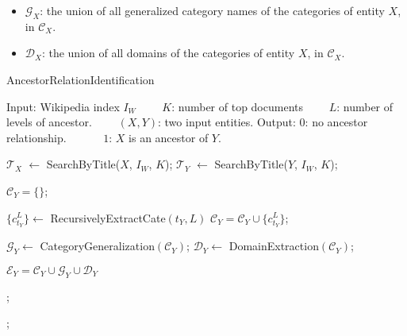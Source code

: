 \begin{itemize}
\item ${\mathcal G}_{X}$: the union of all generalized category names of the categories of entity $X$, in ${\mathcal C}_{X}$.
\item ${\mathcal D}_{X}$: the union of all domains of the categories of entity $X$, in ${\mathcal C}_{X}$.
\end{itemize}

\begin{algorithm} [t]
{\small
\caption{AncestorRelationIdentification}
\label{algAncestorIdentifying} 
\begin{algorithmic}[1]
\STATE Input: Wikipedia index $I_{W	}$ 
\STATE $\qquad$$K$: number of top documents 
\STATE $\qquad$$L$: number of levels of ancestor. 
\STATE $\qquad$$(X, Y)$: two input entities. 
\STATE Output: $0$: no ancestor relationship. 
\STATE $\qquad\quad$$1$: $X$ is an ancestor of $Y$.

\STATE ${\mathcal T_{X}}$ $\leftarrow$ SearchByTitle($X$, $I_{W}$, $K$);
\STATE ${\mathcal T_{Y}}$ $\leftarrow$ SearchByTitle($Y$, $I_{W}$, $K$);

\STATE ${\mathcal C}_{Y} = \{\}$;

\STATE $\{c_{t_{Y}}^{L}\} \leftarrow$ RecursivelyExtractCate$(t_{Y},L)$
\STATE ${\mathcal C}_{Y} = {\mathcal C}_{Y} \cup \{c_{t_{Y}}^{L}\}$;
\ENDFOR

\STATE ${\mathcal G}_{Y} \leftarrow$ CategoryGeneralization$({\mathcal C}_{Y})$;
\STATE ${\mathcal D}_{Y} \leftarrow$ DomainExtraction$({\mathcal C}_{Y})$;

\STATE ${\mathcal E}_{Y} = {\mathcal C}_{Y} \cup {\mathcal G}_{Y} \cup {\mathcal D}_{Y}$

;
\ENDIF
\ENDFOR

;

\end{algorithmic} 
}
\end{algorithm} 


